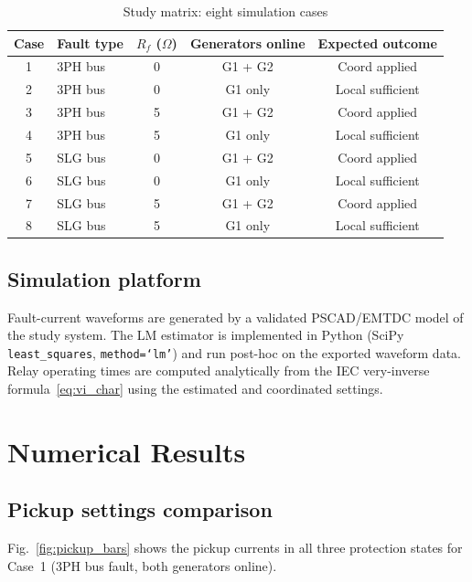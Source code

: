 \documentclass[journal,twoside,letterpaper]{IEEEtran}
\begin{document}
\begin{table}[!t]
\caption{Study matrix: eight simulation cases}
\label{tab:study_matrix}
\centering
\renewcommand{\arraystretch}{1.15}
\begin{tabular}{clccc}
\toprule
Case & Fault type & $R_f$ ($\Omega$) & Generators online &
      Expected outcome \\
\midrule
1 & 3PH bus  & 0   & G1 + G2 & Coord applied \\
2 & 3PH bus  & 0   & G1 only & Local sufficient \\
3 & 3PH bus  & 5   & G1 + G2 & Coord applied \\
4 & 3PH bus  & 5   & G1 only & Local sufficient \\
5 & SLG bus  & 0   & G1 + G2 & Coord applied \\
6 & SLG bus  & 0   & G1 only & Local sufficient \\
7 & SLG bus  & 5   & G1 + G2 & Coord applied \\
8 & SLG bus  & 5   & G1 only & Local sufficient \\
\bottomrule
\end{tabular}
\end{table}

\subsection{Simulation platform}

Fault-current waveforms are generated by a validated
PSCAD/EMTDC model of the study system.
The LM estimator is implemented in Python (SciPy
\texttt{least\_squares}, \texttt{method=`lm'}) and run
post-hoc on the exported waveform data.
Relay operating times are computed analytically from the
IEC very-inverse formula~\eqref{eq:vi_char} using the
estimated and coordinated settings.

\section{Numerical Results}
\label{sec:results}

\subsection{Pickup settings comparison}

Fig.~\ref{fig:pickup_bars} shows the pickup currents in
all three protection states for Case~1 (3PH bus fault,
both generators online).
\end{document}
